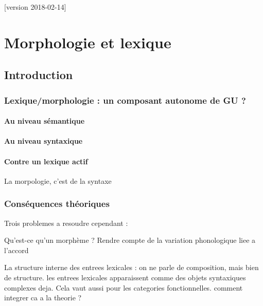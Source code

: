 %

[version 2018-02-14]
%




%

\chapter{Morphologie et lexique}

  \sommaire


\section{Introduction}
  \subsection[Un composant lexical/morphologique dans GU ?]{Lexique/morphologie : un composant autonome de GU ?}
    \subsubsection{Au niveau s\'emantique}
    
    \subsubsection{Au niveau syntaxique}
    
    \subsubsection{Contre un lexique actif}
    La morpologie, c'est de la syntaxe
  \subsection{Cons\'equences th\'eoriques}
    Trois problemes a resoudre cependant :

    Qu'est-ce qu'un morph\`eme ? Rendre compte de la variation phonologique
    liee a l'accord

    La structure interne des entrees lexicales : on ne parle de composition,
    mais bien de structure. les entrees lexicales apparaissent comme des
    objets syntaxiques complexes deja. Cela vaut aussi pour les categories
    fonctionnelles. comment integrer ca a la theorie ?

